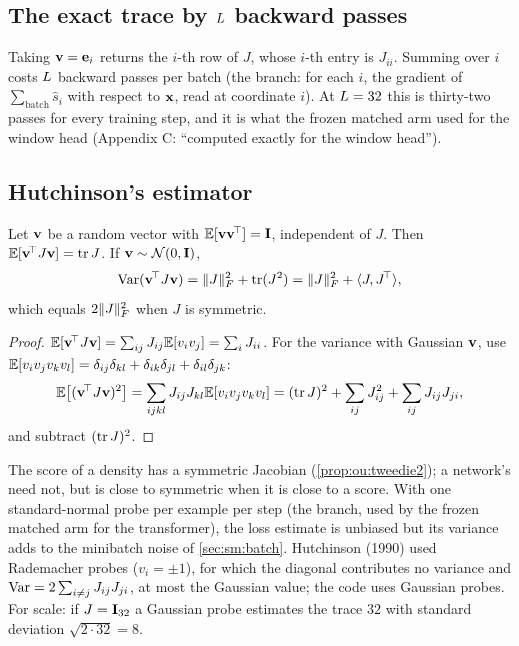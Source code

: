 \subsection{The exact trace by $L$ backward passes}
Taking $\mathbf{v}=\mathbf{e}_i$ returns the $i$-th row of $J$, whose $i$-th entry is
$J_{ii}$. Summing over $i$ costs $L$ backward passes per batch (the
 branch: for each $i$, the gradient of $\sum_{\text{batch}}\widehat s_i$
with respect to $\mathbf{x}$, read at coordinate $i$). At $L=32$ this is thirty-two
passes for every training step, and it is what the frozen matched arm used for the
window head (Appendix C: ``computed exactly for the window head'').

\subsection{Hutchinson's estimator}
\begin{proposition}[Hutchinson]
\label{prop:sm:hutchinson}
Let $\mathbf{v}$ be a random vector with $\mathbb{E}[\mathbf{v}\mathbf{v}^{\!\top}]=\mathbf{I}$, independent
of $J$. Then $\mathbb{E}[\mathbf{v}^{\!\top}J\mathbf{v}]=\operatorname{tr} J$. If $\mathbf{v}\sim\mathcal{N}\!\left(0,\mathbf{I}\right)$,
\[
  \operatorname{Var}(\mathbf{v}^{\!\top}J\mathbf{v})=\lVert J \rVert_{F}^2+\operatorname{tr}(J^2)=\lVert J \rVert_{F}^2+\langle J,J^{\!\top}\rangle,
\]
which equals $2\lVert J \rVert_{F}^2$ when $J$ is symmetric.
\end{proposition}

\begin{proof}
$\mathbb{E}[\mathbf{v}^{\!\top}J\mathbf{v}]=\sum_{ij}J_{ij}\mathbb{E}[v_iv_j]=\sum_iJ_{ii}$. For the variance
with Gaussian $\mathbf{v}$, use $\mathbb{E}[v_iv_jv_kv_l]=\delta_{ij}\delta_{kl}+\delta_{ik}\delta_{jl}+\delta_{il}\delta_{jk}$:
\[
  \mathbb{E}\bigl[(\mathbf{v}^{\!\top}J\mathbf{v})^2\bigr]=\sum_{ijkl}J_{ij}J_{kl}\mathbb{E}[v_iv_jv_kv_l]
  =(\operatorname{tr} J)^2+\sum_{ij}J_{ij}^2+\sum_{ij}J_{ij}J_{ji},
\]
and subtract $(\operatorname{tr} J)^2$.
\end{proof}

The score of a density has a symmetric Jacobian (\cref{prop:ou:tweedie2}); a
network's need not, but is close to symmetric when it is close to a score. With one
standard-normal probe per example per step (the  branch, used by the
frozen matched arm for the transformer), the loss estimate is unbiased but its variance
adds to the minibatch noise of \cref{sec:sm:batch}. Hutchinson (1990) used Rademacher
probes ($v_i=\pm1$), for which the diagonal contributes no variance and
$\operatorname{Var}=2\sum_{i\ne j}J_{ij}J_{ji}$, at most the Gaussian value; the code uses Gaussian
probes. For scale: if $J=\mathbf{I}_{32}$ a Gaussian probe estimates the trace $32$ with
standard deviation $\sqrt{2\cdot32}=8$.

